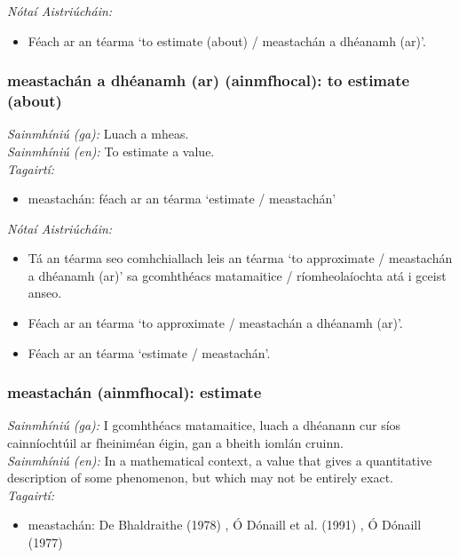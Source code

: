  \noindent \textit{Nótaí Aistriúcháin:}
\begin{itemize}
	\item Féach ar an téarma `to estimate (about) / meastachán a dhéanamh (ar)'.
\end{itemize}


\subsubsection*{meastachán a dhéanamh (ar) (ainmfhocal): to estimate (about)}
 \noindent \textit{Sainmhíniú (ga):} Luach a mheas.
\\
 \noindent \textit{Sainmhíniú (en):} To estimate a value.
\\
 \noindent \textit{Tagairtí:}
\begin{itemize}
	\item meastachán: féach ar an téarma `estimate / meastachán'
\end{itemize}

 \noindent \textit{Nótaí Aistriúcháin:}
\begin{itemize}
	\item Tá an téarma seo comhchiallach leis an téarma `to approximate / meastachán a dhéanamh (ar)' sa gcomhthéacs matamaitice / ríomheolaíochta atá i gceist anseo.
	\item Féach ar an téarma `to approximate / meastachán a dhéanamh (ar)'.
	\item Féach ar an téarma `estimate / meastachán'.
\end{itemize}


\subsubsection*{meastachán (ainmfhocal): estimate}
 \noindent \textit{Sainmhíniú (ga):} I gcomhthéacs matamaitice, luach a dhéanann cur síos cainníochtúil ar fheiniméan éigin, gan a bheith iomlán cruinn.
\\
 \noindent \textit{Sainmhíniú (en):} In a mathematical context, a value that gives a quantitative description of some phenomenon, but which may not be entirely exact.
\\
 \noindent \textit{Tagairtí:}
\begin{itemize}
	\item meastachán: De Bhaldraithe (1978) \cite{de-bhaldraithe}, Ó Dónaill et al. (1991) \cite{focloir-beag}, Ó Dónaill (1977) \cite{odonaill}
\end{itemize}

